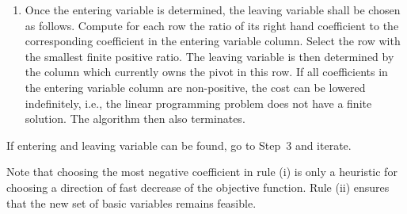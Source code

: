 \begin{enumerate}
\begin{enumerate}
	\item Once the entering variable is determined, the leaving
	variable shall be chosen as follows.  Compute for each row the ratio
	of its right hand coefficient to the corresponding coefficient in the
	entering variable column.  Select the row with the smallest finite
	positive ratio.  The leaving variable is then determined by the column
	which currently owns the pivot in this row.  If all coefficients in
	the entering variable column are non-positive, the cost can be lowered
	indefinitely, i.e., the linear programming problem does not have a
	finite solution.  The algorithm then also terminates.
	\end{enumerate}
	If entering and leaving variable can be found, go to Step~3 and
	iterate.
	
	Note that choosing the most negative coefficient in rule (i) is only a
	heuristic for choosing a direction of fast decrease of the objective
	function.  Rule (ii) ensures that the new set of basic variables
	remains feasible.  
	

\end{enumerate}
